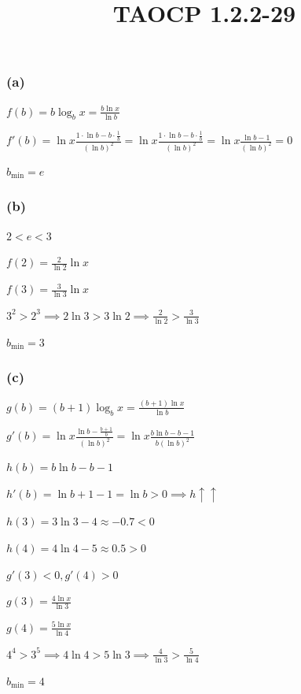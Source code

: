 \documentclass{article}
\title{TAOCP 1.2.2\mbox{-}29}
\begin{document}
\maketitle

\subsubsection*{(a)}

\( f(b) = b \log_b{x} = \frac{b\ln{x}}{\ln{b}} \)

\( f'(b) = \ln{x} \frac{1 \cdot \ln{b} - b \cdot \frac{1}{b}}{{(\ln{b})}^{2}} = \ln{x} \frac{1 \cdot \ln{b} - b \cdot \frac{1}{b}}{{(\ln{b})}^{2}} = \ln{x} \frac{\ln{b} - 1}{{(\ln{b})}^{2}} = 0 \)

\( b_{\min} = e \)

\subsubsection*{(b)}

\( 2 < e < 3 \)

\( f(2) = \frac{2}{\ln{2}}\ln{x} \)

\( f(3) = \frac{3}{\ln{3}}\ln{x} \)

\( 3^{2} > 2^{3} \implies 2\ln{3} > 3\ln{2} \implies \frac{2}{\ln{2}} > \frac{3}{\ln{3}} \)

\( b_{\min} = 3 \)

\subsubsection*{(c)}

\( g(b) = (b+1)\log_b{x} = \frac{(b+1)\ln{x}}{\ln{b}} \)

\( g'(b)=\ln{x}\frac{\ln{b} - \frac{b+1}{b}}{{(\ln{b})}^{2}} = \ln{x}\frac{b\ln{b} - b - 1}{b{(\ln{b})}^{2}} \)

\( h(b) = b\ln{b} - b - 1 \)

\( h'(b) = \ln{b} + 1 - 1 = \ln{b} > 0 \implies h \uparrow \uparrow \)

\( h(3) = 3\ln{3} - 4 \approx -0.7 < 0 \)

\( h(4) = 4\ln{4} - 5 \approx 0.5 > 0 \)

\( g'(3) < 0, g'(4) > 0 \)

\( g(3) = \frac{4\ln{x}}{\ln{3}} \)

\( g(4) = \frac{5\ln{x}}{\ln{4}} \)

\( 4^{4} > 3^{5} \implies 4 \ln{4} > 5 \ln{3} \implies \frac{4}{\ln{3}} > \frac{5}{\ln{4}} \)

\( b_{\min} = 4 \)
\end{document}
